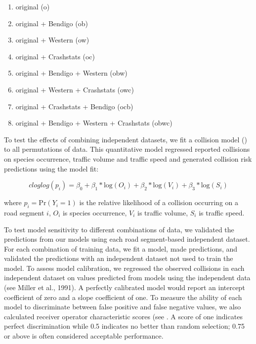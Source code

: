\begin{enumerate}
	\item original (o)
	\item original + Bendigo (ob)
	\item original + Western (ow)
	\item original + Crashstats (oc)
	\item original + Bendigo + Western (obw)
	\item original + Western + Crashstats (owc)
	\item original + Crashstats + Bendigo (ocb)
	\item original + Bendigo + Western + Crashstats (obwc)
\end{enumerate}

To test the effects of combining independent datasets, we fit a collision model () to all permutations of data.  This quantitative model regressed reported collisions on species occurrence, traffic volume and traffic speed and generated collision risk predictions using the model fit:

\begin{equation} \label{eq:61}
cloglog(p_i) = \beta_0 + \beta_1*\text{log}(O_i) + \beta_2*\text{log}(V_i) + \beta_3*\text{log}(S_i)
\end{equation}

\noindent where $p_i=\text{Pr}(Y_i=1)$ is the relative likelihood of a collision occurring on a road segment $i$, $O_i$ is species occurrence, $V_i$ is traffic volume, $S_i$ is traffic speed.

To test model sensitivity to different combinations of data, we validated the predictions from our models using each road segment-based independent dataset. For each combination of training data, we fit a model, made predictions, and validated the predictions with an independent dataset not used to train the model. To assess model calibration, we regressed the observed collisions in each independent dataset on values predicted from models using the independent data (see Miller et al., 1991). A perfectly calibrated model would report an intercept coefficient of zero and a slope coefficient of one. To measure the ability of each model to discriminate between false positive and false negative values, we also calculated receiver operator characteristic scores (see \cite{metz78}. A score of one indicates perfect discrimination while 0.5 indicates no better than random selection; 0.75 or above is often considered acceptable performance.

